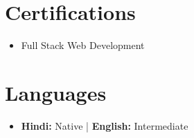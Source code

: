 \documentclass[letterpaper,11pt]{article}
\newcommand{\resumeItem}[2]{
  \item\small{
    \textbf{#1}{ #2 \vspace{-2pt}}
  }
}
\newcommand{\resumeSubItem}[2]{\resumeItem{#1}{#2}\vspace{-4pt}}
\newcommand{\resumeSubHeadingListStart}{\begin{itemize}[leftmargin=*]}
\newcommand{\resumeSubHeadingListEnd}{\end{itemize}}
\begin{document}
\section{Certifications}
\resumeSubHeadingListStart
\resumeSubItem{}{Full Stack Web Development}
\resumeSubHeadingListEnd

\section{Languages}
\resumeSubHeadingListStart
\resumeSubItem{}{\textbf{Hindi:} Native | \textbf{English:} Intermediate}
\resumeSubHeadingListEnd
\end{document}

